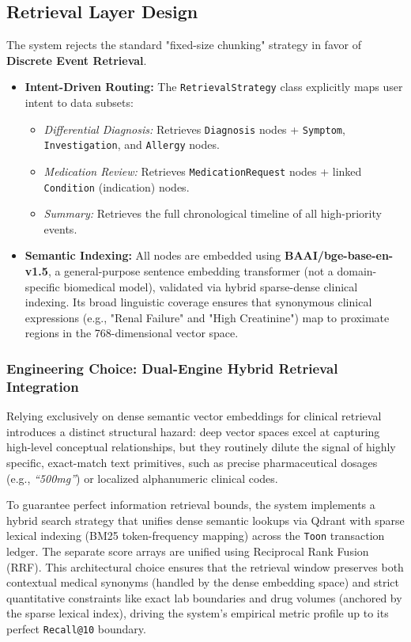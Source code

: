 \subsection{Retrieval Layer Design}
The system rejects the standard "fixed-size chunking" strategy in favor of \textbf{Discrete Event Retrieval}.
\begin{itemize}
    \item \textbf{Intent-Driven Routing:} The \texttt{RetrievalStrategy} class explicitly maps user intent to data subsets:
    \begin{itemize}
        \item \emph{Differential Diagnosis:} Retrieves \texttt{Diagnosis} nodes + \texttt{Symptom}, \texttt{Investigation}, and \texttt{Allergy} nodes.
        \item \emph{Medication Review:} Retrieves \texttt{MedicationRequest} nodes + linked \texttt{Condition} (indication) nodes.
        \item \emph{Summary:} Retrieves the full chronological timeline of all high-priority events.
    \end{itemize}
    \item \textbf{Semantic Indexing:} All nodes are embedded using \textbf{BAAI/bge-base-en-v1.5}, a general-purpose sentence embedding transformer (not a domain-specific biomedical model), validated via hybrid sparse-dense clinical indexing. Its broad linguistic coverage ensures that synonymous clinical expressions (e.g., "Renal Failure" and "High Creatinine") map to proximate regions in the 768-dimensional vector space.
\end{itemize}

\subsubsection{Engineering Choice: Dual-Engine Hybrid Retrieval Integration}
Relying exclusively on dense semantic vector embeddings for clinical retrieval introduces a distinct structural hazard: deep vector spaces excel at capturing high-level conceptual relationships, but they routinely dilute the signal of highly specific, exact-match text primitives, such as precise pharmaceutical dosages (e.g., \textit{``500mg''}) or localized alphanumeric clinical codes.

To guarantee perfect information retrieval bounds, the system implements a hybrid search strategy that unifies dense semantic lookups via Qdrant with sparse lexical indexing (BM25 token-frequency mapping) across the \texttt{Toon} transaction ledger. The separate score arrays are unified using Reciprocal Rank Fusion (RRF). This architectural choice ensures that the retrieval window preserves both contextual medical synonyms (handled by the dense embedding space) and strict quantitative constraints like exact lab boundaries and drug volumes (anchored by the sparse lexical index), driving the system's empirical metric profile up to its perfect \texttt{Recall@10} boundary.

